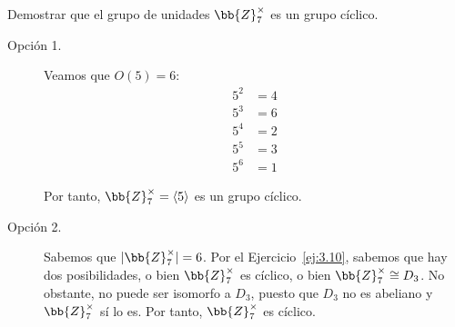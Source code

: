 \begin{ejercicio}\label{ej:3.16}
    Demostrar que el grupo de unidades $\bb{Z}_7^\times$ es un grupo cíclico.\\

    \begin{description}
        \item[Opción 1.] Veamos que $O(5)=6$:
        \begin{align*}
            5^2 &= 4\\
            5^3 &= 6\\
            5^4 &= 2\\
            5^5 &= 3\\
            5^6 &= 1
        \end{align*}
    
        Por tanto, $\bb{Z}_7^\times = \langle 5\rangle$ es un grupo cíclico.
        
        \item[Opción 2.] Sabemos que $|\bb{Z}_7^\times|=6$. Por el Ejercicio~\ref{ej:3.10}, sabemos que hay dos posibilidades, o bien $\bb{Z}_7^\times$ es cíclico, o bien $\bb{Z}_7^\times\cong D_3$. No obstante, no puede ser isomorfo a $D_3$, puesto que $D_3$ no es abeliano y $\bb{Z}_7^\times$ sí lo es. Por tanto, $\bb{Z}_7^\times$ es cíclico.
    \end{description}
\end{ejercicio}

